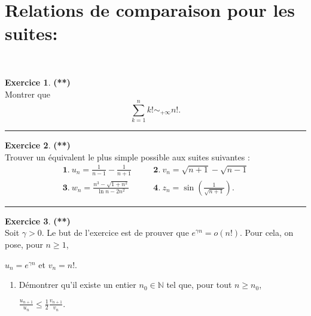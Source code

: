 \documentclass[a4paper,11pt]{article}
\theoremstyle{definition}
\newtheorem{exo}{Exercice} %
\begin{document}
\section*{Relations de comparaison pour les suites:}\hfill\\%
\begin{minipage}{1\linewidth}
	\begin{minipage}[t]{0.48\linewidth}
		\raggedright
		
		
		\begin{exo}\textbf{(**)}\quad\\[0.2cm]
	Montrer que 
	$$\sum_{k=1}^n k!\sim_{+\infty} n!.$$
		
	\centering
	\rule{1\linewidth}{0.6pt}
\end{exo}
		
		
		\begin{exo}\textbf{(**)}\quad\\[0.2cm]
			Trouver un équivalent le plus simple possible aux suites suivantes :
			$$\begin{array}{lll}
			\mathbf 1.\ u_n=\frac{1}{n-1}-\frac{1}{n+1}&\quad&\mathbf 2.\ v_n=\sqrt{n+1}-\sqrt{n-1}\\
			\mathbf 3.\ w_n=\frac{n^3-\sqrt{1+n^2}}{\ln n-2n^2}&\quad&\mathbf 4.\ z_n=\sin\left(\frac1{\sqrt{n+1}}\right).
			\end{array}$$
			
			\centering
			\rule{1\linewidth}{0.6pt}
		\end{exo}
		

		
		
		
	\end{minipage}	
	\hfill\vrule\hfill
	\begin{minipage}[t]{0.48\linewidth}
		\raggedright
		
		\begin{exo}\textbf{(**)}\quad\\[0.2cm]
			
			Soit $\gamma>0$. Le but de l'exercice est de prouver que 
			$e^{\gamma n}=o(n!).$ Pour cela, on pose, pour $n\geq 1$, 
			
			\centering$u_n=e^{\gamma n}$ et $v_n=n!$.
			
			\raggedright 
			
			\begin{enumerate}
				\item Démontrer qu'il existe un entier $n_0\in\mathbb N$ tel que, pour tout $n\geq n_0$, 
				
				\centering$\frac{u_{n+1}}{u_n}\leq\frac 12\frac{v_{n+1}}{v_n}.$
				

\end{enumerate}
\end{exo}
\end{minipage}
\end{minipage}
\end{document}
